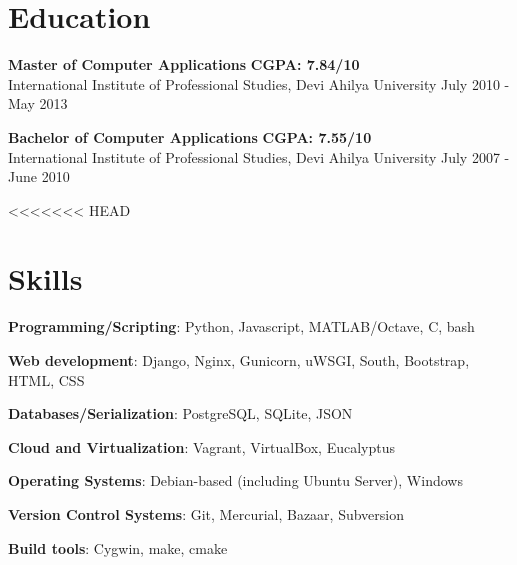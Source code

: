 \documentclass[margin,line]{resume}
\begin{document}
\begin{resume}
    \section{\mysidestyle Education}

    \begin{list2}
	\item \textbf{Master of Computer Applications} \hspace{73mm} \textbf{CGPA: 7.84/10} \\ International Institute of Professional Studies, Devi Ahilya University \hspace{17mm} July 2010 - May 2013
	\end{list2}

	\begin{list2}
	\item \textbf{Bachelor of Computer Applications} \hspace{70mm} \textbf{CGPA: 7.55/10} \\ International Institute of Professional Studies, Devi Ahilya University \hspace{20mm} July 2007 - June 2010
	\end{list2}

<<<<<<< HEAD
    \section{\mysidestyle Skills} 

    \begin{list2}
	\item \textbf{Programming/Scripting}: \hspace{5mm} Python, Javascript, MATLAB/Octave, C, bash
	\item \textbf{Web development}: \hspace{16mm} Django, Nginx, Gunicorn, uWSGI, South, Bootstrap, HTML, CSS
	\item \textbf{Databases/Serialization}: \hspace{5.7mm} PostgreSQL, SQLite,	JSON
	\item \textbf{Cloud and Virtualization}: \hspace{3mm} Vagrant, VirtualBox, Eucalyptus
	\item \textbf{Operating Systems}: \hspace{13.8mm} Debian-based (including Ubuntu Server), Windows
	\item \textbf{Version Control Systems}: \hspace{3.8mm} Git, Mercurial, Bazaar, Subversion
	\item \textbf{Build tools}: \hspace{28mm} Cygwin, make, cmake
	\end{list2}


\end{resume}
\end{document}
